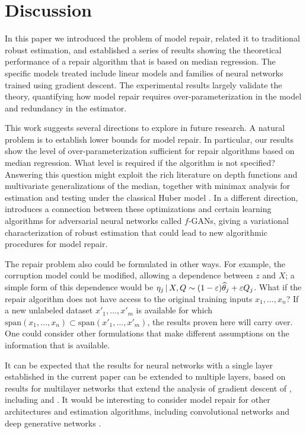 
\def\ones{{\mathds{1}}}

\section{Discussion}
\label{sec:discuss}

In this paper we introduced the problem of model repair, related it to traditional robust estimation, and established a series of results showing the theoretical performance of a repair algorithm that is based on median regression. The specific models treated include linear models and families of neural networks trained using gradient descent. The experimental results largely validate the theory, quantifying how model repair requires over-parameterization in the model and redundancy in the estimator.

This work suggests several directions to explore in future research.  A natural problem is to establish lower bounds for  model repair. In particular, our results show the level of over-parameterization sufficient for repair algorithms based on median regression. What level is required if the algorithm is not specified? Answering this question might exploit the rich literature on depth functions and multivariate generalizations of the median, together with minimax analysis for estimation and testing under the classical Huber model \citep{chaodepth,diakonikolas,diakonikolas:2017}. In a different direction, \cite{gao2018robust} introduces a connection between these optimizations and certain learning algorithms for adversarial neural networks called $f$-GANs, giving a variational characterization of robust estimation that could lead to new algorithmic procedures for model repair.


The repair problem also could be formulated in other ways.  For example,
the corruption model could be modified, allowing a dependence between $z$ and $X$;
a simple form of this dependence would be $\eta_j \,|\, X, Q \sim (1-\varepsilon) \widehat\theta_j + \varepsilon Q_j$.
What if the repair algorithm does not have access to the original training inputs $x_1,\ldots, x_n$?
If a new unlabeled dataset $x'_1,\ldots, x'_{m}$ is available for which $\text{span}(x_1,\ldots,x_n) \subset \text{span}(x'_1,\ldots,x'_{m})$, the results proven here will carry over. One could consider other formulations that make different assumptions on the information that is available.

It can be expected that the results for neural networks with a single layer established in the current paper
can be extended to multiple layers, based on results for multilayer networks that extend the analysis of gradient descent
of \cite{du2018gradient}, including \cite{zhuli} and \cite{dulee}. It would be interesting to
consider model repair for other architectures and estimation algorithms, including convolutional networks
and deep generative networks \citep{goodfellow2014generative,nvp,glow}.

